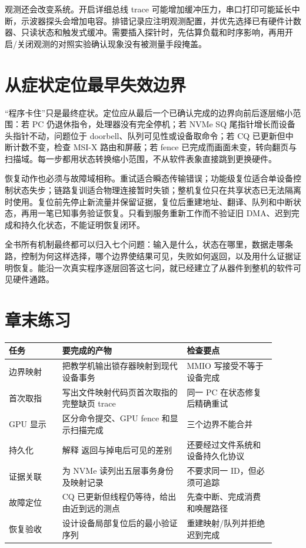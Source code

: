 观测还会改变系统。开启详细总线 trace 可能增加缓冲压力，串口打印可能延长中断，示波器探头会增加电容。排错记录应注明观测配置，并优先选择已有硬件计数器、只读状态和触发式缓冲。需要插入探针时，先估算负载和时序影响，再用开启/关闭观测的对照实验确认现象没有被测量手段掩盖。

\section{从症状定位最早失效边界}

“程序卡住”只是最终症状。定位应从最后一个已确认完成的边界向前后逐层缩小范围：若 PC 仍退休指令，处理器没有完全停机；若 NVMe SQ 尾指针增长而设备头指针不动，问题位于 doorbell、队列可见性或设备取命令；若 CQ 已更新但中断计数不变，检查 MSI-X 路由和屏蔽；若 fence 已完成而画面未变，转向翻页与扫描域。每一步都用状态转换缩小范围，不从软件表象直接跳到更换硬件。

恢复动作也必须与故障域相称。重试适合瞬态传输错误；功能级复位适合单设备控制状态失步；链路复训适合物理连接暂时失锁；整机复位只在共享状态已无法隔离时使用。复位前先停止新流量并保留证据，复位后重建地址、翻译、队列和中断状态，再用一笔已知事务验证恢复。只看到服务重新工作而不验证旧 DMA、迟到完成和持久化状态，不能证明恢复闭环。

\begin{keyidea}
全书所有机制最终都可以归入七个问题：输入是什么，状态在哪里，数据走哪条路，控制为何这样选择，哪个边界使结果可见，失败如何返回，以及用什么证据证明恢复。能沿一次真实程序逐层回答这七问，就已经建立了从器件到整机的软件可见硬件通路。
\end{keyidea}

\section*{章末练习}

\begin{longtable}{L{0.18\linewidth}L{0.42\linewidth}L{0.30\linewidth}}
\toprule
任务 & 要完成的产物 & 检查要点 \\
\midrule
边界映射 & 把教学机输出锁存器映射到现代设备事务 & MMIO 写接受不等于设备完成 \\
首次取指 & 写出文件映射代码页首次取指的完整缺页 trace & 同一 PC 在状态修复后精确重试 \\
GPU 显示 & 区分命令提交、GPU fence 和显示扫描完成 & 三个边界不能合并 \\
持久化 & 解释  返回与掉电后可见的差别 & 还要经过文件系统和设备持久化协议 \\
证据关联 & 为 NVMe 读列出五层事务身份及映射记录 & 不要求同一 ID，但必须可追踪 \\
故障定位 & CQ 已更新但线程仍等待，给出由近到远的测点 & 先查中断、完成消费和唤醒路径 \\
恢复验收 & 设计设备局部复位后的最小验证序列 & 重建映射/队列并拒绝迟到完成 \\
\bottomrule
\end{longtable}

